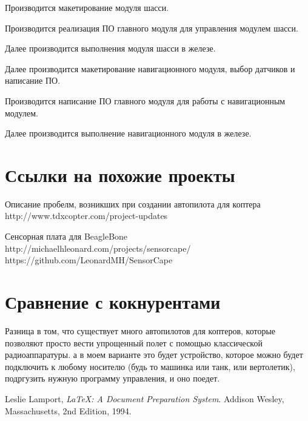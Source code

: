 \documentclass[utf8]{report}
\begin{document}
Производится макетирование модуля шасси.

Производится реализация ПО главного модуля для управления модулем шасси.

Далее производится выполнения модуля шасси в железе.

Далее производится макетирование навигационного модуля, выбор датчиков и написание ПО.

Производится написание ПО главного модуля для работы с навигационным модулем.

Далее производится выполнение навигационного модуля в железе.


\chapter{Ссылки на похожие проекты}

Описание пробелм, возникших при создании автопилота для коптера
http://www.tdxcopter.com/project-updates

Сенсорная плата для BeagleBone
http://michaelhleonard.com/projects/sensorcape/
https://github.com/LeonardMH/SensorCape

\chapter{Сравнение с кокнурентами}

Разница в том, что существует много автопилотов для коптеров, которые позволяют просто вести упрощенный полет с помощью классической радиоаппаратуры. а в моем варианте это будет устройство, которое можно будет подключить к любому носителю (будь то машинка или танк, или вертолетик), подргузить нужную программу управления, и оно поедет.

\begin{thebibliography}{9}
      Leslie Lamport,
      \emph{\LaTeX: A Document Preparation System}.
      Addison Wesley, Massachusetts,
      2nd Edition,
      1994.
 
\end{thebibliography}
 
\end{document}
